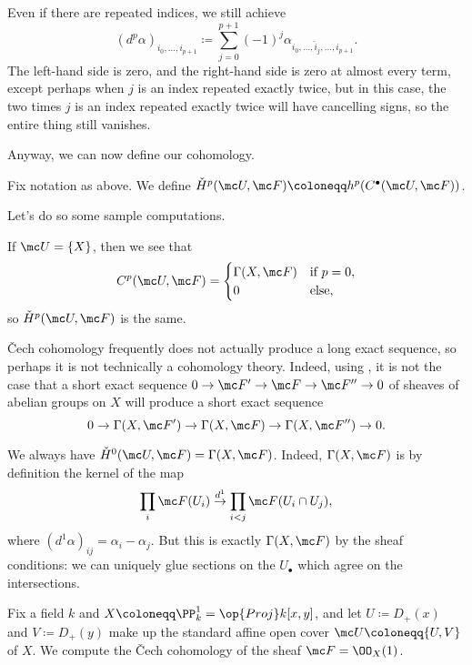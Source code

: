 \documentclass[../notes.tex]{subfiles}
\begin{document}
\begin{remark}
	Even if there are repeated indices, we still achieve
	\[(d^p\alpha)_{i_0,\ldots,i_{p+1}}\coloneqq\sum_{j=0}^{p+1}(-1)^j\alpha_{i_0,\ldots,\widehat i_j,\ldots,i_{p+1}}.\]
	The left-hand side is zero, and the right-hand side is zero at almost every term, except perhaps when $j$ is an index repeated exactly twice, but in this case, the two times $j$ is an index repeated exactly twice will have cancelling signs, so the entire thing still vanishes.
\end{remark}
Anyway, we can now define our cohomology.
\begin{defihelper} 
	Fix notation as above. We define $\check H^p(\mc U,\mc F)\coloneqq h^p(C^\bullet(\mc U,\mc F))$.
\end{defihelper}
Let's do so some sample computations.
\begin{example} \label{ex:cech-trivial-open-cover}
	If $\mc U=\{X\}$, then we see that
	\[C^p(\mc U,\mc F)=\begin{cases}
		\Gamma(X,\mc F) & \text{if }p=0, \\
		0 & \text{else},
	\end{cases}\]
	so $\check H^p(\mc U,\mc F)$ is the same.
\end{example}
\begin{remark}
	\v Cech cohomology frequently does not actually produce a long exact sequence, so perhaps it is not technically a cohomology theory. Indeed, using , it is not the case that a short exact sequence $0\to\mc F'\to\mc F\to\mc F''\to0$ of sheaves of abelian groups on $X$ will produce a short exact sequence
	\[0\to\Gamma(X,\mc F')\to\Gamma(X,\mc F)\to\Gamma(X,\mc F'')\to0.\]
\end{remark}
\begin{example} \label{ex:cech-h0}
	We always have $\check H^0(\mc U,\mc F)=\Gamma(X,\mc F)$. Indeed, $\Gamma(X,\mc F)$ is by definition the kernel of the map
	\[\prod_i\mc F(U_i)\stackrel{d^1}\to\prod_{i<j}\mc F(U_i\cap U_j),\]
	where $(d^1\alpha)_{ij}=\alpha_i-\alpha_j$. But this is exactly $\Gamma(X,\mc F)$ by the sheaf conditions: we can uniquely glue sections on the $U_\bullet$ which agree on the intersections.
\end{example}
\begin{exe}
	Fix a field $k$ and $X\coloneqq\PP^1_k=\op{Proj}k[x,y]$, and let $U\coloneqq D_+(x)$ and $V\coloneqq D_+(y)$ make up the standard affine open cover $\mc U\coloneqq\{U,V\}$ of $X$. We compute the \v Cech cohomology of the sheaf $\mc F=\OO_X(1)$.
\end{exe}
\end{document}
